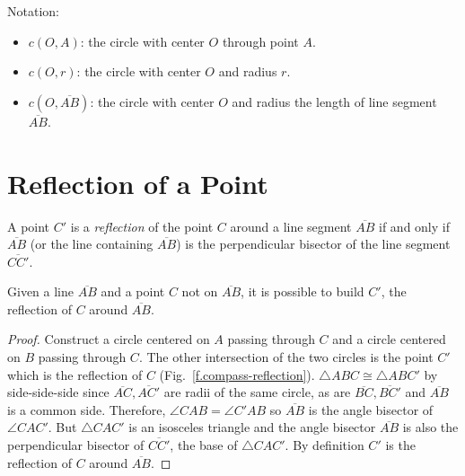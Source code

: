 \newpage

\noindent{}Notation:
\begin{itemize}
\item $c(O,A)$: the circle with center $O$ through point $A$.
\item $c(O,r)$: the circle with center $O$ and radius $r$.
\item $c(O,\overline{AB})$: the circle with center $O$ and radius the length of line segment $\overline{AB}$.
\end{itemize}


\section{Reflection of a Point}\label{s.reflection}

\begin{definition}
A point $C'$ is a \emph{reflection} of the point $C$ around a line segment $\overline{AB}$ if and only if $\overline{AB}$ (or the line containing $\overline{AB}$) is the perpendicular bisector of the line segment $\overline{CC'}$.
\end{definition}

\begin{theorem}
Given a line $\overline{AB}$ and a point $C$ not on $\overline{AB}$, it is possible to build $C'$, the reflection of $C$ around $\overline{AB}$.
\end{theorem}

\begin{proof} 
Construct a circle centered on $A$ passing through $C$ and a circle centered on $B$ passing through $C$. The other intersection of the two circles is the point $C'$ which is the reflection of $C$ (Fig.~\ref{f.compass-reflection}).
$\triangle ABC \cong \triangle ABC'$ by side-side-side since $\overline{AC}, \overline{AC'}$ are radii of the same circle, as are $\overline{BC}, \overline{BC'}$ and $\overline{AB}$ is a common side. Therefore, $\angle CAB = \angle C'AB$ so $\overline{AB}$ is the angle bisector of $\angle CAC'$. But $\triangle CAC'$ is an isosceles triangle and the angle bisector $\overline{AB}$ is also the perpendicular bisector of $\overline{CC'}$, the base of $\triangle CAC'$. By definition $C'$ is the reflection of $C$ around $\overline{AB}$.
\end{proof}

